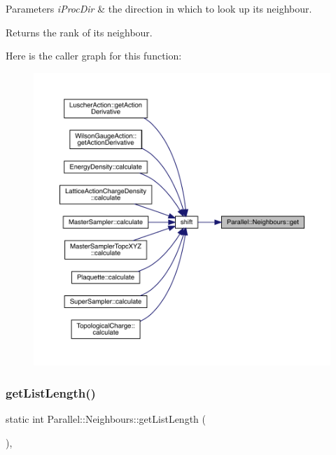 \begin{DoxyParams}{Parameters}
{\em i\+Proc\+Dir} & the direction in which to look up its neighbour. \\
\hline
\end{DoxyParams}
\begin{DoxyReturn}{Returns}
the rank of its neighbour. 
\end{DoxyReturn}
Here is the caller graph for this function\+:\nopagebreak
\begin{figure}[H]
\begin{center}
\leavevmode
\includegraphics[width=350pt]{class_parallel_1_1_neighbours_a84653f3e22436280ac5a4689a24e7146_icgraph}
\end{center}
\end{figure}
\mbox{\label{class_parallel_1_1_neighbours_aadbdf345a7b541bd6705bddac1969961}} 
\subsubsection{\texorpdfstring{getListLength()}{getListLength()}}
{\footnotesize\ttfamily static int Parallel\+::\+Neighbours\+::get\+List\+Length (\begin{DoxyParamCaption}{ }\end{DoxyParamCaption})\hspace{0.3cm}{\ttfamily [inline]}, {\ttfamily [static]}}

